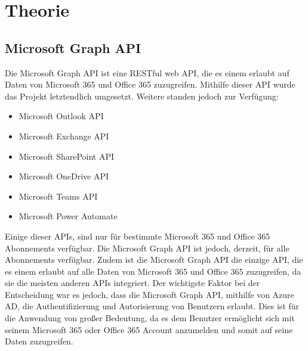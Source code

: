 


\section{Theorie}\label{sec:theorie}

\subsection{Microsoft Graph API}\label{subsec:microsoft-graph-api}
Die Microsoft Graph API ist eine \gls{RESTful} web API, die es einem erlaubt auf Daten von Microsoft 365 und Office 365 zuzugreifen.
Mithilfe dieser API wurde das Projekt letztendlich umgesetzt.
Weitere standen jedoch zur Verfügung:
\begin{itemize}
    \item Microsoft Outlook API
    \item Microsoft Exchange API
    \item Microsoft SharePoint API
    \item Microsoft OneDrive API
    \item Microsoft Teams API
    \item Microsoft Power Automate
\end{itemize}
Einige dieser APIs, sind nur für bestimmte Microsoft 365 und Office 365 Abonnements verfügbar.
Die Microsoft Graph API ist jedoch, derzeit, für alle Abonnements verfügbar.
Zudem ist die Microsoft Graph API die einzige API, die es einem erlaubt auf alle Daten von Microsoft 365 und Office 365 zuzugreifen, da sie die meisten anderen APIs integriert.
Der wichtigste Faktor bei der Entscheidung war es jedoch, dass die Microsoft Graph API, mithilfe von Azure AD, die Authentifizierung und Autorisierung von Benutzern erlaubt. Dies ist für die Anwendung von großer Bedeutung, da es dem Benutzer ermöglicht sich mit seinem Microsoft 365 oder Office 365 Account anzumelden und somit auf seine Daten zuzugreifen.

